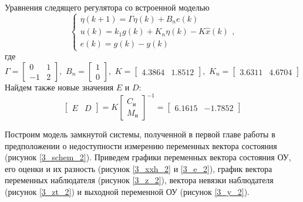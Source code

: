 Уравнения следящего регулятора со встроенной моделью
\begin{equation}
\begin{cases}
\eta (k+1) = \Gamma \eta (k) + B_n e(k)\\
u(k) = k_1 g(k) + K_n \eta (k) - K\hat{x} (k)\\
e(k) = g(k) - y(k)
\end{cases},
\end{equation}
где
\begin{equation*}
	\Gamma = \begin{bmatrix}
0 & 1\\
-1 & 2
	\end{bmatrix}, \, \, 
	B_n = \begin{bmatrix}
1 \\ 0
	\end{bmatrix}, \, \, 
	K = \begin{bmatrix}
			4.3864 &	1.8512
	\end{bmatrix}, \, \, 
	K_n = \begin{bmatrix}
		3.6311 & 4.6704
	\end{bmatrix}
\end{equation*}
Найдем также новые значения $E$ и $D$:
\begin{equation}
\begin{bmatrix}
	E & D
\end{bmatrix}  = K \begin{bmatrix}
C_\text{и}\\ M_\text{н}
\end{bmatrix}^{-1} = \begin{bmatrix}    
6.1615 &  -1.7852
\end{bmatrix}
\end{equation}

Построим модель замкнутой системы, полученной в первой главе работы в предположении о недоступности измерению переменных вектора состояния (рисунок \ref{3_schem_2}). Приведем графики переменных вектора состояния ОУ, его оценки и их разность (рисунок \ref{3_xxh_2} и \ref{3_e_2}), график вектора переменных наблюдателя (рисунок \ref{3_z_2}), вектора невязки наблюдателя (рисунок \ref{3_zt_2}) и выходной переменной ОУ (рисунок \ref{3_y_2}).

